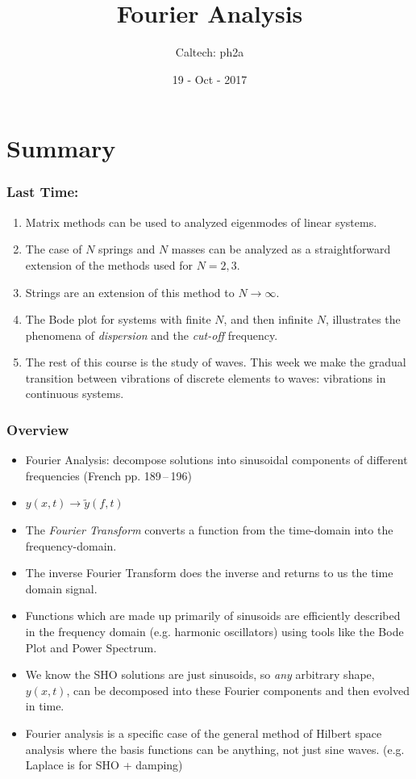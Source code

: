 \documentclass[pdf, handout, hideothersubsections]{beamer}
\begin{document}
\title{Fourier Analysis}  
\author{Caltech: ph2a}
\date{19 - Oct - 2017}


\frame{\titlepage} 



\section{Summary}
\begin{frame}
\frametitle{Last Time:}
\begin{enumerate}
  \pause
\item Matrix methods can be used to analyzed eigenmodes of linear systems.
  \pause
\item The case of $N$ springs and $N$ masses can be analyzed as a
  straightforward extension of the methods used for $N = 2, 3$.
  \pause
\item Strings are an extension of this method to $N \rightarrow \infty$.
  \pause
\item The Bode plot for systems with finite $N$, and then 
  infinite $N$, illustrates the phenomena of \emph{dispersion} and the
  \emph{cut-off} frequency.
\pause
\item The rest of this course is the study of waves. This week we make
  the gradual transition between vibrations of discrete elements to
  waves: vibrations in continuous systems.
\end{enumerate}
\end{frame}


\begin{frame}
\frametitle{Overview}
\pause
\begin{itemize}
\item Fourier Analysis: decompose solutions into sinusoidal components
  of different frequencies
  (French pp. 189\,--\,196)
  \pause
\item $y(x, t) \rightarrow \tilde{y}(f, t)$
  \pause
\item The \emph{Fourier Transform} converts a function from the
  time-domain into the frequency-domain.
  \pause
\item The inverse Fourier Transform does the inverse and returns to us
  the time domain signal.
  \pause
\item Functions which are made up primarily of sinusoids are
  efficiently described in the frequency domain (e.g. harmonic
  oscillators) using tools like the Bode Plot and Power Spectrum.
  \pause
\item We know the SHO solutions are just sinusoids, so \emph{any}
  arbitrary shape, $y(x,t)$, can be decomposed into these Fourier
  components and then evolved in time.
\pause
\item Fourier analysis is a specific case of the general method of
  Hilbert space analysis where the basis functions can be anything,
  not just sine waves. (e.g. Laplace is for SHO + damping)
\end{itemize}
\end{frame}
\end{document}
